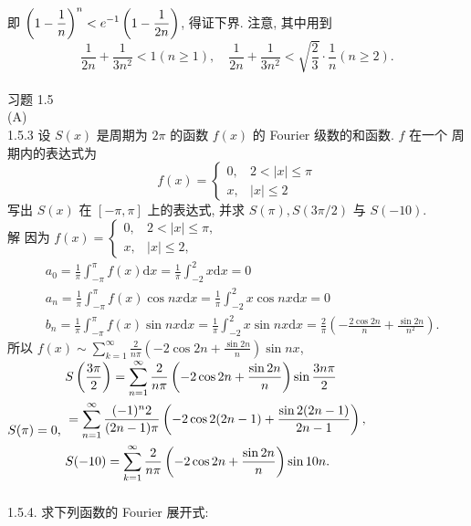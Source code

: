 \documentclass[a4paper,11pt,UTF8]{article}
\begin{document}
即 $\displaystyle \displaystyle \left(1-\frac{1}{n}\right)^n<e^{-1}\left(1-\frac{1}{2 n}\right)$, 得证下界. 注意, 其中用到
$$
\frac{1}{2 n}+\frac{1}{3 n^2}<1(n \geq 1), \quad \frac{1}{2 n}+\frac{1}{3 n^2}<\sqrt{\frac{2}{3}} \cdot \frac{1}{n}(n \geq 2) .
$$\\
习题 1.5\\
(A)\\
1.5.3 设 $S(x)$ 是周期为 $2 \pi$ 的函数 $\displaystyle f(x)$ 的 Fourier 级数的和函数. $\displaystyle f$ 在一个 周期内的表达式为
$$
f(x)= \begin{cases}0, & 2<|x| \leq \pi \\ x, & |x| \leq 2\end{cases}
$$
写出 $S(x)$ 在 $[-\pi, \pi]$ 上的表达式, 并求 $S(\pi), S(3 \pi / 2)$ 与 $S(-10)$.\\
解 因为 $\displaystyle f(x)= \begin{cases}0, & 2<|x| \leq \pi, \\ x, & |x| \leq 2,\end{cases}$\\
$$
\begin{aligned}
	& a_0=\frac{1}{\pi} \int_{-\pi}^\pi f(x) \mathrm{d}x=\frac{1}{\pi} \int_{-2}^2 x \mathrm{d}x=0 \\
	& a_n=\frac{1}{\pi} \int_{-\pi}^\pi f(x) \cos n x \mathrm{d}x=\frac{1}{\pi} \int_{-2}^2 x \cos n x \mathrm{d}x=0 \\
	& b_n=\frac{1}{\pi} \int_{-\pi}^\pi f(x) \sin n x \mathrm{d}x=\frac{1}{\pi} \int_{-2}^2 x \sin n x \mathrm{d}x=\frac{2}{\pi}\left(-\frac{2 \cos 2 n}{n}+\frac{\sin 2 n}{n^2}\right) .
\end{aligned}
$$
所以 $\displaystyle f(x) \sim \sum_{k=1}^{\infty} \frac{2}{n \pi}\left(-2 \cos 2 n+\frac{\sin 2 n}{n}\right) \sin n x$,\\
$ S(\pi)=0 \text {, } \\
	\begin{aligned}
	& S\left(\frac{3 \pi}{2}\right)=\sum_{n=1}^{\infty} \frac{2}{n \pi}\left(-2 \cos 2 n+\frac{\sin 2 n}{n}\right) \sin \frac{3 n \pi}{2} \\
	& =\sum_{n=1}^{\infty} \frac{(-1)^n 2}{(2 n-1) \pi}\left(-2 \cos 2(2 n-1)+\frac{\sin 2(2 n-1)}{2 n-1}\right) \text {, } \\
	& S(-10)=\sum_{k=1}^{\infty} \frac{2}{n \pi}\left(-2 \cos 2 n+\frac{\sin 2 n}{n}\right) \sin 10 n . \\
	&
\end{aligned}
$\\
1.5.4. 求下列函数的 Fourier 展开式:\\
\end{document}
